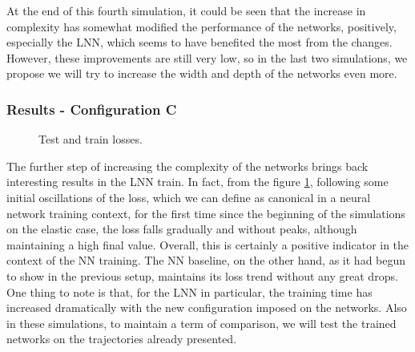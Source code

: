 \documentclass[a4paper]{article}
\begin{document}
At the end of this fourth simulation, it could be seen that the increase in complexity has somewhat modified the performance of the networks, positively, especially the LNN, which seems to have benefited the most from the changes. However, these improvements are still very low, so in the last two simulations, we propose we will try to increase the width and depth of the networks even more.\\

\subsubsection{Results - Configuration C}
\begin{figure}
    \centering
    \qquad
    \caption{Test and train losses.}
    \label{fig:elastic_losses_700_5}
\end{figure}

The further step of increasing the complexity of the networks brings back interesting results in the LNN train. In fact, from the figure \ref{fig:elastic_losses_700_5}, following some initial oscillations of the loss, which we can define as canonical in a neural network training context, for the first time since the beginning of the simulations on the elastic case, the loss falls gradually and without peaks, although maintaining a high final value. Overall, this is certainly a positive indicator in the context of the NN training. The NN baseline, on the other hand, as it had begun to show in the previous setup, maintains its loss trend without any great drops. One thing to note is that, for the LNN in particular, the training time has increased dramatically with the new configuration imposed on the networks. Also in these simulations, to maintain a term of comparison, we will test the trained networks on the trajectories already presented.\\
\end{document}
